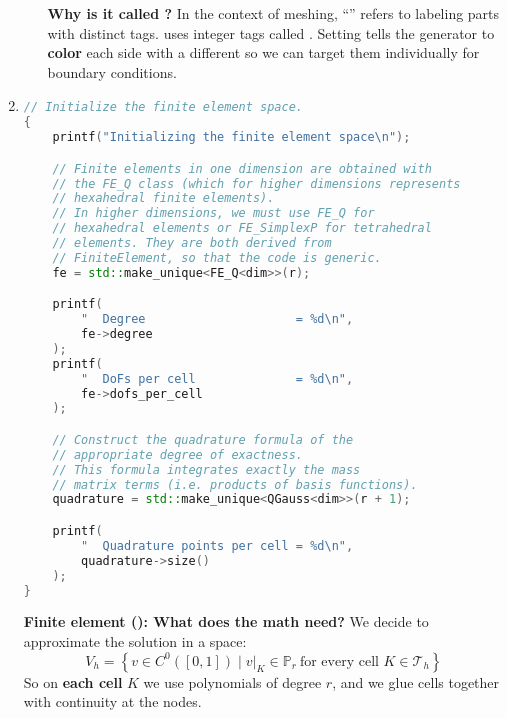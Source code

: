 \begin{enumerate}
\begin{enumerate}
        \textcolor{Green3}{ \textbf{Why is it called ?}} In the context of meshing, ``'' refers to labeling parts with distinct tags.  uses integer tags called . Setting  tells the generator to \textbf{color} each side with a different  so we can target them individually for boundary conditions.
    \end{enumerate}


    

    \newpage
    \item {}
    \begin{lstlisting}[language=C++]
// Initialize the finite element space.
{
    printf("Initializing the finite element space\n");

    // Finite elements in one dimension are obtained with
    // the FE_Q class (which for higher dimensions represents
    // hexahedral finite elements).
    // In higher dimensions, we must use FE_Q for
    // hexahedral elements or FE_SimplexP for tetrahedral
    // elements. They are both derived from
    // FiniteElement, so that the code is generic.
    fe = std::make_unique<FE_Q<dim>>(r);

    printf(
        "  Degree                     = %d\n",
        fe->degree
    );
    printf(
        "  DoFs per cell              = %d\n",
        fe->dofs_per_cell
    );

    // Construct the quadrature formula of the
    // appropriate degree of exactness.
    // This formula integrates exactly the mass
    // matrix terms (i.e. products of basis functions).
    quadrature = std::make_unique<QGauss<dim>>(r + 1);

    printf(
        "  Quadrature points per cell = %d\n",
        quadrature->size()
    );
}\end{lstlisting}
    \textcolor{Green3}{ \textbf{Finite element (): What does the math need?}} We decide to approximate the solution in a space:
    \begin{equation*}
        V_{h} = \left\{v\in C^0([0,1]) \;|\; v|_K \in \mathbb P_r \ \text{for every cell }K\in\mathcal T_h\right\}
    \end{equation*}
    So on \textbf{each cell} $K$ we use polynomials of degree $r$, and we glue cells together with continuity at the nodes.


\end{enumerate}
